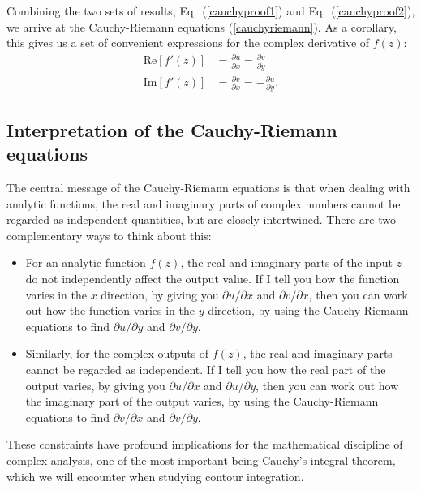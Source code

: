 \documentclass[10pt,a4paper]{article}
\begin{document}
Combining the two sets of results, Eq.~(\ref{cauchyproof1}) and
Eq.~(\ref{cauchyproof2}), we arrive at the Cauchy-Riemann equations
(\ref{cauchyriemann}).  As a corollary, this gives us a set of
convenient expressions for the complex derivative of $f(z)$:
\begin{align}
  \mathrm{Re}\left[f'(z)\right] &= \frac{\partial u}{\partial x}
  = \frac{\partial v}{\partial y} \\
  \mathrm{Im}\left[f'(z)\right] &= \frac{\partial v}{\partial x}
  = -\frac{\partial u}{\partial y}.
\end{align}

\subsection{Interpretation of the Cauchy-Riemann equations}
\label{interpretation-of-the-cauchy-riemann-equations}

The central message of the Cauchy-Riemann equations is that when
dealing with analytic functions, the real and imaginary parts of
complex numbers cannot be regarded as independent quantities, but are
closely intertwined. There are two complementary ways to think about
this:

\begin{itemize}
\item
  For an analytic function $f(z)$, the real and imaginary parts of the
  input $z$ do not independently affect the output value. If I tell
  you how the function varies in the $x$ direction, by giving you
  $\partial u/\partial x$ and $\partial v/\partial x$, then you can
  work out how the function varies in the $y$ direction, by using the
  Cauchy-Riemann equations to find $\partial u/\partial y$ and
  $\partial v/\partial y$.
\item
  Similarly, for the complex outputs of $f(z)$, the real and imaginary
  parts cannot be regarded as independent. If I tell you how the real
  part of the output varies, by giving you $\partial u/\partial x$ and
  $\partial u/\partial y$, then you can work out how the imaginary
  part of the output varies, by using the Cauchy-Riemann equations to
  find $\partial v/\partial x$ and $\partial v/\partial y$.
\end{itemize}

\noindent
These constraints have profound implications for the mathematical
discipline of complex analysis, one of the most important being
Cauchy's integral theorem, which we will encounter when studying
contour integration.
\end{document}
